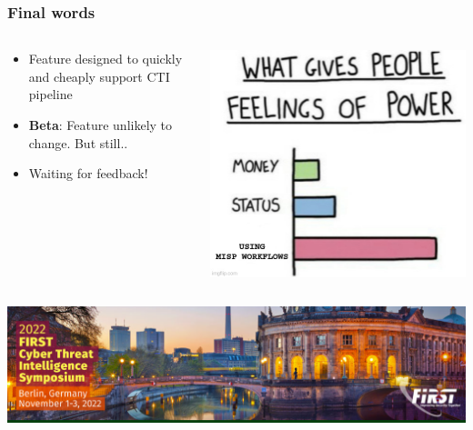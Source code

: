 \begin{frame}
    \frametitle{Final words}
    \begin{columns}
        \begin{column}{0.6\textwidth}
            \begin{itemize}
                \item Feature designed to quickly and cheaply support CTI pipeline
                \item \textbf{Beta}: Feature unlikely to change. But still..
                \item Waiting for feedback!
            \end{itemize}
        \end{column}
        \begin{column}{0.4\textwidth}
            \includegraphics[width=1.0\linewidth]{pictures/feeling-of-power.jpg}
        \end{column}
    \end{columns}
    \vspace*{0.5em}
    \includegraphics[width=1.0\linewidth]{pictures/first-cti.png}
\end{frame}

